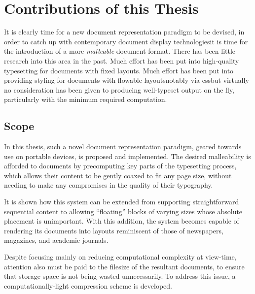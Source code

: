 \section{Contributions of this Thesis}

It is clearly time for a new document representation paradigm to be devised, in order to catch up with contemporary document display technologies\ed it is time for the introduction of a more \emph{malleable} document format. There has been little research into this area in the past. Much effort has been put into high-quality typesetting for documents with fixed layouts. Much effort has been put into providing styling for documents with flowable layouts\ed notably via css\ed but virtually no consideration has been given to producing well-typeset output on the fly, particularly with the minimum required computation.

\subsection{Scope}

In this thesis, such a novel document representation paradigm, geared towards use on portable devices, is proposed and implemented. The desired malleability is afforded to documents by precomputing key parts of the typesetting process, which allows their content to be gently coaxed to fit any page size, without needing to make any compromises in the quality of their typography.

It is shown how this system can be extended from supporting straightforward sequential content to allowing ``floating'' blocks of varying sizes whose absolute placement is unimportant. With this addition, the system becomes capable of rendering its documents into layouts reminiscent of those of newspapers, magazines, and academic journals.

Despite focusing mainly on reducing computational complexity at view-time, attention also must be paid to the filesize of the resultant documents, to ensure that storage space is not being wasted unnecessarily. To address this issue, a computationally-light compression scheme is developed.


